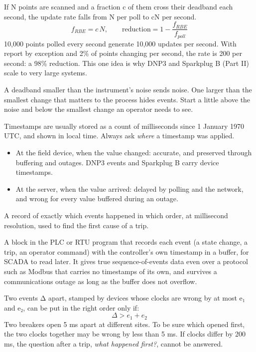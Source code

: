  If N points are scanned and a fraction c of them cross their deadband each second, the update rate falls from N per poll to cN per second.
\[ f_{RBE} = c\,N, \qquad \text{reduction} = 1 - \frac{f_{RBE}}{f_{poll}} \]
 10,000 points polled every second generate 10,000 updates per second. With report by exception and 2\% of points changing per second, the rate is 200 per second: a 98\% reduction. This one idea is why DNP3 and Sparkplug B (Part II) scale to very large systems.

 A deadband smaller than the instrument's noise sends noise. One larger than the smallest change that matters to the process hides events. Start a little above the noise and below the smallest change an operator needs to see.

Timestamps are usually stored as a count of milliseconds since 1 January 1970 UTC, and shown in local time. Always ask \emph{where} a timestamp was applied.
\begin{itemize}
\item At the field device, when the value changed: accurate, and preserved through buffering and outages. DNP3 events and Sparkplug B carry device timestamps.
\item At the server, when the value arrived: delayed by polling and the network, and wrong for every value buffered during an outage.
\end{itemize}
 A record of exactly which events happened in which order, at millisecond resolution, used to find the first cause of a trip.

 A block in the PLC or RTU program that records each event (a state change, a trip, an operator command) with the controller's own timestamp in a buffer, for SCADA to read later. It gives true sequence-of-events data even over a protocol such as Modbus that carries no timestamps of its own, and survives a communications outage as long as the buffer does not overflow.

 Two events Δ apart, stamped by devices whose clocks are wrong by at most e₁ and e₂, can be put in the right order only if:
\[ \Delta > e_1 + e_2 \]
Two breakers open 5 ms apart at different sites. To be sure which opened first, the two clocks together may be wrong by less than 5 ms. If clocks differ by 200 ms, the question after a trip, \emph{what happened first?}, cannot be answered.

